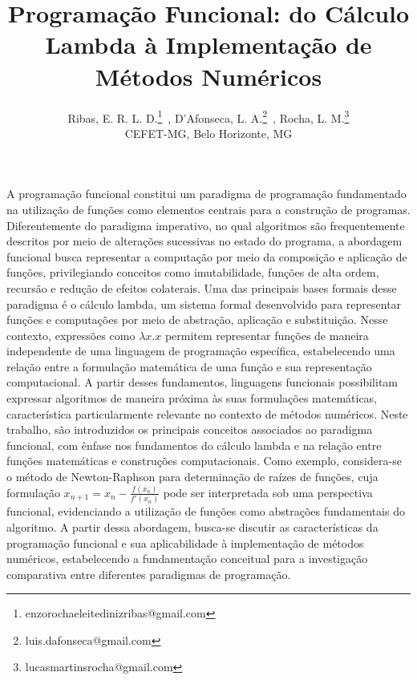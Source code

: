\documentclass{pssbmac}
\begin{document}
\title{Programação Funcional: do Cálculo Lambda à Implementação de Métodos Numéricos}

\author{
{\large Ribas, E. R. L. D.}\thanks{enzorochaeleitedinizribas@gmail.com}\, ,
{\large D'Afonseca, L. A.}\thanks{luis.dafonseca@gmail.com}\, ,
{\large Rocha, L. M.}\thanks{lucasmartinsrocha@gmail.com}  \\
{\small CEFET-MG, Belo Horizonte, MG} \\
}
\criartitulo
\vspace{-.5cm}
A programação funcional constitui um paradigma de programação fundamentado na utilização de funções como elementos centrais para a construção de programas. Diferentemente do paradigma imperativo, no qual algoritmos são frequentemente descritos por meio de alterações sucessivas no estado do programa, a abordagem funcional busca representar a computação por meio da composição e aplicação de funções, privilegiando conceitos como imutabilidade, funções de alta ordem, recursão e redução de efeitos colaterais. Uma das principais bases formais desse paradigma é o cálculo lambda, um sistema formal desenvolvido para representar funções e computações por meio de abstração, aplicação e substituição. Nesse contexto, expressões como $\lambda x.x$ permitem representar funções de maneira independente de uma linguagem de programação específica, estabelecendo uma relação entre a formulação matemática de uma função e sua representação computacional. A partir desses fundamentos, linguagens funcionais possibilitam expressar algoritmos de maneira próxima às suas formulações matemáticas, característica particularmente relevante no contexto de métodos numéricos. Neste trabalho, são introduzidos os principais conceitos associados ao paradigma funcional, com ênfase nos fundamentos do cálculo lambda e na relação entre funções matemáticas e construções computacionais. Como exemplo, considera-se o método de Newton-Raphson para determinação de raízes de funções, cuja formulação $x_{n+1}=x_n-\frac{f(x_n)}{f'(x_n)}$ pode ser interpretada sob uma perspectiva funcional, evidenciando a utilização de funções como abstrações fundamentais do algoritmo. A partir dessa abordagem, busca-se discutir as características da programação funcional e sua aplicabilidade à implementação de métodos numéricos, estabelecendo a fundamentação conceitual para a investigação comparativa entre diferentes paradigmas de programação.

\end{document}
